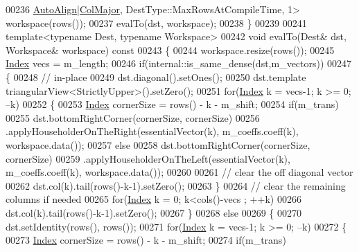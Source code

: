 \begin{DoxyCode}
00236              \hyperlink{group__enums_ggaacded1a18ae58b0f554751f6cdf9eb13a28d63c0dd8560827162decfd898804f4}{AutoAlign}|\hyperlink{group__enums_ggaacded1a18ae58b0f554751f6cdf9eb13a0cbd4bdd0abcfc0224c5fcb5e4f6669a}{ColMajor}, DestType::MaxRowsAtCompileTime, 1> workspace(rows());
00237       evalTo(dst, workspace);
00238     \}
00239 
00241     \textcolor{keyword}{template}<\textcolor{keyword}{typename} Dest, \textcolor{keyword}{typename} Workspace>
00242     \textcolor{keywordtype}{void} evalTo(Dest& dst, Workspace& workspace)\textcolor{keyword}{ const}
00243 \textcolor{keyword}{    }\{
00244       workspace.resize(rows());
00245       \hyperlink{group___core___module_a554f30542cc2316add4b1ea0a492ff02}{Index} vecs = m\_length;
00246       \textcolor{keywordflow}{if}(internal::is\_same\_dense(dst,m\_vectors))
00247       \{
00248         \textcolor{comment}{// in-place}
00249         dst.diagonal().setOnes();
00250         dst.template triangularView<StrictlyUpper>().setZero();
00251         \textcolor{keywordflow}{for}(\hyperlink{group___core___module_a554f30542cc2316add4b1ea0a492ff02}{Index} k = vecs-1; k >= 0; --k)
00252         \{
00253           \hyperlink{group___core___module_a554f30542cc2316add4b1ea0a492ff02}{Index} cornerSize = rows() - k - m\_shift;
00254           \textcolor{keywordflow}{if}(m\_trans)
00255             dst.bottomRightCorner(cornerSize, cornerSize)
00256                .applyHouseholderOnTheRight(essentialVector(k), m\_coeffs.coeff(k), workspace.data());
00257           \textcolor{keywordflow}{else}
00258             dst.bottomRightCorner(cornerSize, cornerSize)
00259                .applyHouseholderOnTheLeft(essentialVector(k), m\_coeffs.coeff(k), workspace.data());
00260 
00261           \textcolor{comment}{// clear the off diagonal vector}
00262           dst.col(k).tail(rows()-k-1).setZero();
00263         \}
00264         \textcolor{comment}{// clear the remaining columns if needed}
00265         \textcolor{keywordflow}{for}(\hyperlink{group___core___module_a554f30542cc2316add4b1ea0a492ff02}{Index} k = 0; k<cols()-vecs ; ++k)
00266           dst.col(k).tail(rows()-k-1).setZero();
00267       \}
00268       \textcolor{keywordflow}{else}
00269       \{
00270         dst.setIdentity(rows(), rows());
00271         \textcolor{keywordflow}{for}(\hyperlink{group___core___module_a554f30542cc2316add4b1ea0a492ff02}{Index} k = vecs-1; k >= 0; --k)
00272         \{
00273           \hyperlink{group___core___module_a554f30542cc2316add4b1ea0a492ff02}{Index} cornerSize = rows() - k - m\_shift;
00274           \textcolor{keywordflow}{if}(m\_trans)

\end{DoxyCode}
